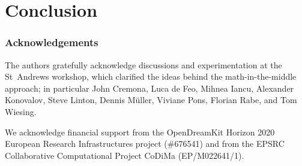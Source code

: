 \section{Conclusion}
\subsubsection*{Acknowledgements}
The authors gratefully acknowledge discussions and experimentation at the St~Andrews
workshop, which clarified the ideas behind the math-in-the-middle approach; in particular
John Cremona, Luca de Feo, Mihnea Iancu, Alexander Konovalov, Steve Linton, Dennis
M\"uller, Viviane Pons, Florian Rabe, and Tom Wiesing.

We acknowledge financial support from the OpenDreamKit Horizon 2020 European Research
Infrastructures project (\#676541) and from the EPSRC Collaborative Computational Project
CoDiMa (EP/M022641/1).


